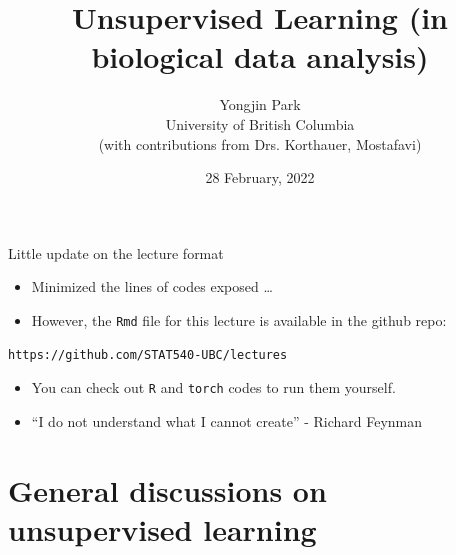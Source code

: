 \documentclass[
  ignorenonframetext,
  aspectratio=169]{beamer}
\title{Unsupervised Learning (in biological data analysis)}
\author{Yongjin Park\\
University of British Columbia\\
(with contributions from Drs. Korthauer, Mostafavi)}
\date{28 February, 2022}
\begin{document}
\frame{\titlepage}

\begin{frame}[fragile]{Little update on the lecture format}
\protect\hypertarget{little-update-on-the-lecture-format}{}
\begin{itemize}
\item
  Minimized the lines of codes exposed \ldots{}
\item
  However, the \texttt{Rmd} file for this lecture is available in the
  github repo:
\end{itemize}

\begin{verbatim}
https://github.com/STAT540-UBC/lectures
\end{verbatim}

\begin{itemize}
\item
  You can check out \texttt{R} and \texttt{torch} codes to run them
  yourself.
\item
  ``I do not understand what I cannot create'' - Richard Feynman
\end{itemize}
\end{frame}

\hypertarget{general-discussions-on-unsupervised-learning}{%
\section{General discussions on unsupervised
learning}\label{general-discussions-on-unsupervised-learning}}
\end{document}
